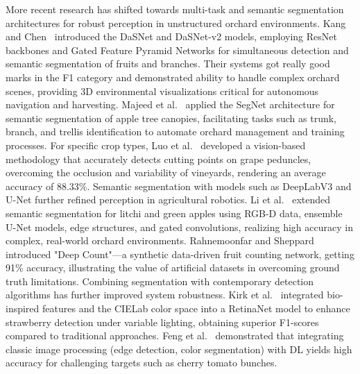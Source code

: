 \documentclass[a4paper,fleqn]{cas-dc}
\begin{document}
More recent research has shifted towards multi-task and semantic segmentation architectures for robust perception in unstructured orchard environments. Kang and Chen~\cite{kang2019fruit, kang2020fruit} introduced the DaSNet and DaSNet-v2 models, employing ResNet backbones and Gated Feature Pyramid Networks for simultaneous detection and semantic segmentation of fruits and branches. Their systems got really good marks in the F1 category and demonstrated ability to handle complex orchard scenes, providing 3D environmental visualizations critical for autonomous navigation and harvesting. Majeed et al.~\cite{majeed2020deep} applied the SegNet architecture for semantic segmentation of apple tree canopies, facilitating tasks such as trunk, branch, and trellis identification to automate orchard management and training processes.
For specific crop types, 
Luo et al.~\cite{luo2018vision} developed a vision-based methodology that accurately detects cutting points on grape peduncles, overcoming the occlusion and variability of vineyards, rendering an average accuracy of 88.33\%.
Semantic segmentation with models such as DeepLabV3 and U-Net further refined perception in agricultural robotics. 
Li et al.~\cite{li2020detection, li2021novel} extended semantic segmentation for litchi and green apples using RGB-D data, ensemble U-Net models, edge structures, and gated convolutions, realizing high accuracy in complex, real-world orchard environments.
Rahnemoonfar and Sheppard~\cite{rahnemoonfar2017deep} introduced "Deep Count"—a synthetic data-driven fruit counting network, getting 91\% accuracy, illustrating the value of artificial datasets in overcoming ground truth limitations.
Combining segmentation with contemporary detection algorithms has further improved system robustness. 
Kirk et al.~\cite{kirk2020b} integrated bio-inspired features and the CIELab color space into a RetinaNet model to enhance strawberry detection under variable lighting, obtaining superior F1-scores compared to traditional approaches. 
Feng et al.~\cite{feng2018} demonstrated that integrating classic image processing (edge detection, color segmentation) with DL yields high accuracy for challenging targets such as cherry tomato bunches.
\end{document}
